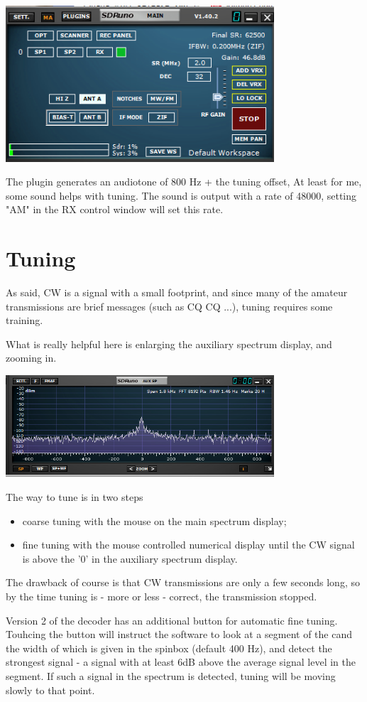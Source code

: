 \documentclass[11pt]{article}
\begin{document}
\includegraphics[width=100mm]{main-widget.png}

The plugin generates an audiotone of 800 Hz + the tuning offset,
At least for me, some sound helps with tuning.
The sound is output with a rate of 48000, setting "AM" in the RX control window
will set this rate.

\section{Tuning}
As said, CW is a signal with a small footprint, and since many of
the amateur transmissions are brief messages (such as CQ CQ ...), tuning
requires some training.
\par
What is really helpful here is enlarging the auxiliary spectrum display,
and zooming in.

\includegraphics[width=100mm]{auxiliary-spectrum-display.png}

The way to tune is in two steps
\begin{itemize}
\item coarse tuning with the mouse on the main spectrum display;
\item fine tuning with the mouse controlled numerical display until the
CW signal is above the '0' in the auxiliary spectrum display.
\end{itemize}
The drawback of course is that CW transmissions are only a few seconds long,
so by the time tuning is - more or less - correct, the transmission stopped.
\par
Version 2 of the decoder has an additional button for automatic fine tuning.
Touhcing the button will instruct the software to look at a segment of the
cand the width of which is given in the spinbox (default 400 Hz), and
detect the strongest signal - a signal with at least 6dB above the
average signal level in the segment. If such a signal in the spectrum is
detected, tuning will be moving slowly to that point.
\end{document}
